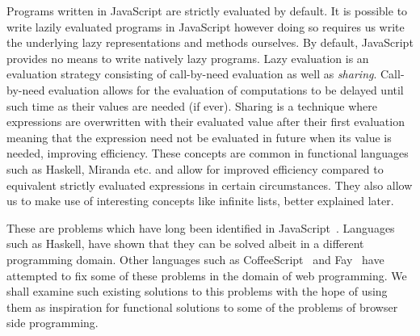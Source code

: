 Programs written in JavaScript are strictly evaluated by default. It is possible to write
lazily evaluated programs in JavaScript however doing so requires us write the underlying
lazy representations and methods ourselves. By default, JavaScript provides no means to 
write natively lazy programs. Lazy evaluation is an evaluation strategy consisting of 
call-by-need evaluation as well as \emph{sharing}. Call-by-need evaluation allows for the evaluation of
computations to be delayed until such time as their values are needed (if ever). Sharing
is a technique where expressions are overwritten with their evaluated value after their
first evaluation meaning that the expression need not be evaluated in future when its
value is needed, improving efficiency. These concepts are common in functional languages
such as Haskell, Miranda etc. and allow for improved efficiency compared to equivalent
strictly evaluated expressions in certain circumstances. They also allow us to make use
of interesting concepts like infinite lists, better explained later.

These are problems which have long been identified in JavaScript~\cite{JSGoodParts}. Languages such
as Haskell, have shown that they can be solved albeit in a different programming domain.
Other languages such as CoffeeScript~\cite{Coffee} and Fay~\cite{Fay} have attempted to fix some of these 
problems in the domain of web programming. We shall examine such existing solutions
to this problems with the hope of using them as inspiration for functional solutions
to some of the problems of browser side programming.
